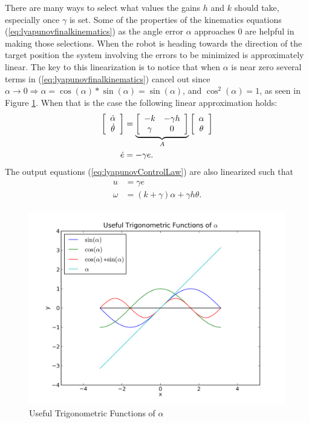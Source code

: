 There are many ways to select what values the gains $h$ and $k$ should take, especially once $\gamma$ is set. Some of the properties of the kinematics equations (\ref{eq:lyapunovfinalkinematics}) as the angle error $\alpha$ approaches $0$ are helpful in making those selections. When the robot is heading towards the direction of the target position the system involving the errors to be minimized is approximately linear. The key to this linearization is to notice that when $\alpha$ is near zero several terms in (\ref{eq:lyapunovfinalkinematics}) cancel out since $\alpha\to0\Rightarrow \alpha=\cos(\alpha)*\sin(\alpha)=\sin(\alpha)$, and $\cos^2(\alpha)=1$, as seen in Figure \ref{fig:plotSinCos}. When that is the case the following linear approximation holds:
\begin{align}
\label{eq:lyapunovLinearSystem}
\begin{split}
\left[\begin{array}{c} \dot{\alpha} \\ \dot{\theta} \end{array}\right]
&= \underbrace{\left[\begin{array}{c c} -k & -\gamma h \\ \gamma & 0 \end{array}\right]}_{A}
\left[\begin{array}{c} \alpha \\ \theta \end{array}\right] \\
\dot{e} &= -\gamma e.
\end{split}
\end{align}
The output equations (\ref{eq:lyapunovControlLaw}) are also linearized such that
\begin{align}
\label{eq:lyapunovLinearOutput}
\begin{split}
u &= \gamma e \\
\omega &= (k+\gamma)\alpha + \gamma h\theta.
\end{split}
\end{align}

\begin{figure}[ht!]
	\centering
	\includegraphics[width=.75\textwidth]{images/plotSinCos}
	\caption{Useful Trigonometric Functions of $\alpha$}
	\label{fig:plotSinCos}
\end{figure}

